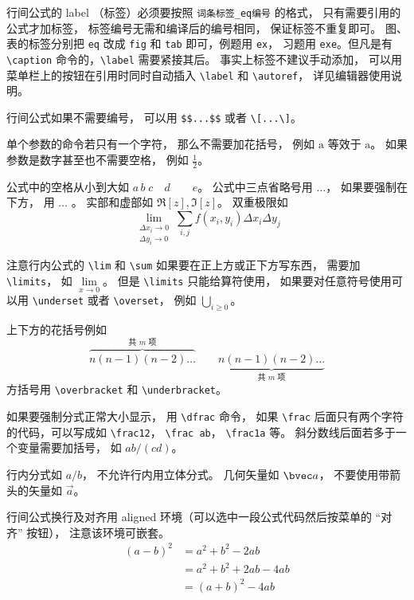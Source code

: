 行间公式的 label （标签）必须要按照 \verb|词条标签_eq编号| 的格式， 只有需要引用的公式才加标签， 标签编号无需和编译后的编号相同， 保证标签不重复即可。 图、表的标签分别把 \verb|eq| 改成 \verb|fig| 和 \verb|tab| 即可，例题用 \verb|ex|， 习题用 \verb|exe|。但凡是有 \verb|\caption| 命令的，\verb|\label| 需要紧接其后。 事实上标签不建议手动添加， 可以用菜单栏上的按钮在引用时同时自动插入 \verb|\label| 和 \verb|\autoref|， 详见编辑器使用说明。

行间公式如果不需要编号， 可以用 \verb|$$...$$| 或者 \verb|\[...\]|。


单个参数的命令若只有一个字符， 那么不需要加花括号， 例如 $\mathrm a$ 等效于 $\mathrm{a}$。 如果参数是数字甚至也不需要空格， 例如 $\frac12$。

公式中的空格从小到大如 $a\, b\; c\quad d\qquad e$。 公式中三点省略号用 $\dots$， 如果要强制在下方， 用 $\ldots$ 。 实部和虚部如 $\Re[z], \Im[z]$。 双重极限如
\begin{equation}
\lim_{\substack{\Delta x_i\to 0\\ \Delta y_i\to 0}} \sum_{i, j} f(x_i,y_i) \Delta x_i \Delta y_j
\end{equation}




注意行内公式的 \verb|\lim|  和 \verb|\sum| 如果要在正上方或正下方写东西， 需要加 \verb|\limits|， 如 $\lim\limits_{x\to 0}$。 但是 \verb|\limits| 只能给算符使用， 如果要对任意符号使用可以用 \verb|\underset| 或者 \verb|\overset|， 例如 $\underset{i \ge 0}{\bigcup}$。

上下方的花括号例如
\begin{equation}
\overbrace{n(n-1)(n-2)\dots}^{\text{共 $m$ 项}} \qquad \underbrace{n(n-1)(n-2)\dots}_{\text{共 $m$ 项}}
\end{equation}
方括号用 \verb|\overbracket| 和 \verb|\underbracket|。

如果要强制分式正常大小显示， 用 \verb|\dfrac| 命令， 如果 \verb|\frac| 后面只有两个字符的代码，可以写成如 \verb|\frac12|， \verb|\frac ab|， \verb|\frac1a| 等。 斜分数线后面若多于一个变量需要加括号， 如 $ab/(cd)$。

行内分式如 $a/b$， 不允许行内用立体分式。 几何矢量如 $\bvec a$， 不要使用带箭头的矢量如 $\vec a$。 

行间公式换行及对齐用 aligned 环境（可以选中一段公式代码然后按菜单的 “对齐” 按钮）， 注意该环境可嵌套。
\begin{equation}
\begin{aligned}
(a-b)^2 &= a^2+b^2 - 2ab \\
& = a^2+b^2+2ab-4ab\\
& = (a+b)^2-4ab
\end{aligned}
\end{equation}

